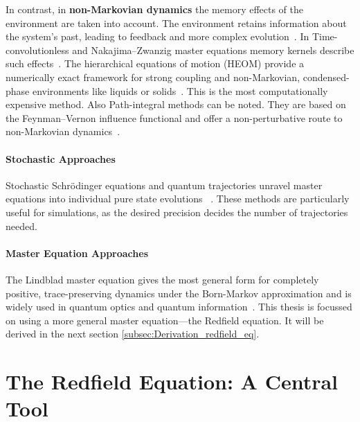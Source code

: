\noindent
In contrast, in \textbf{non-Markovian dynamics} the memory effects of the environment are taken into account. The environment retains information about the system's past, leading to feedback and more complex evolution~\cite{breuerpetruccione2009theoryopenquantum, rivasetal2014quantumnonmarkovianitycharacterization}.
\noindent
In Time-convolutionless and Nakajima–Zwanzig master equations memory kernels describe such effects~\cite{breuerpetruccione2009theoryopenquantum, rivasetal2014quantumnonmarkovianitycharacterization}. The hierarchical equations of motion (HEOM) provide a numerically exact framework for strong coupling and non-Markovian, condensed-phase environments like liquids or solids~\cite{tanimura2020numericallyexactapproach}. This is the most computationally expensive method. Also Path-integral methods can be noted. They are based on the Feynman–Vernon influence functional and offer a non-perturbative route to non-Markovian dynamics~\cite{weiss2012quantumdissipativesystems}.


\paragraph{Stochastic Approaches}

\noindent
Stochastic Schrödinger equations and quantum trajectories unravel master equations into individual pure state evolutions ~\cite{vogtetal2013stochasticblochredfieldtheory, breuerpetruccione2009theoryopenquantum, carmichael1993opensystemsapproach}. These methods are particularly useful for simulations, as the desired precision decides the number of trajectories needed.

\paragraph{Master Equation Approaches}

\noindent
The Lindblad master equation gives the most general form for completely positive, trace-preserving dynamics under the Born-Markov approximation and is widely used in quantum optics and quantum information~\cite{breuerpetruccione2009theoryopenquantum, lindblad1976generatorsquantumdynamical}.
This thesis is focussed on using a more general master equation—the Redfield equation. It will be derived in the next section \ref{subsec:Derivation_redfield_eq}.


\section{The Redfield Equation: A Central Tool}
\label{sec:Redfield_eq}

